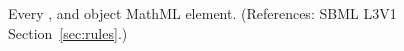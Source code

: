 Every \AssignmentRule, \RateRule and \AlgebraicRule object
 MathML  element.  (References: SBML L3V1
Section~\ref{sec:rules}.)
